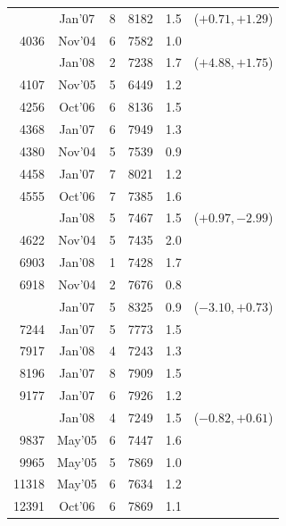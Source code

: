 \begin{table}
{\begin{tabular}{|r c c c c c|}
       &  Jan\hfill '07   &    8 &  8182  &   1.5 & ($+0.71 , +1.29$) \\
 4036  &  Nov\hfill '04   &    6 &  7582  &   1.0 &                   \\
       &  Jan\hfill '08   &    2 &  7238  &   1.7 & ($+4.88 , +1.75$) \\
 4107  &  Nov\hfill '05   &    5 &  6449  &   1.2 &                   \\
 4256  &  Oct\hfill '06   &    6 &  8136  &   1.5 &                   \\
 4368  &  Jan\hfill '07   &    6 &  7949  &   1.3 &                   \\
 4380  &  Nov\hfill '04   &    5 &  7539  &   0.9 &                   \\
 4458  &  Jan\hfill '07   &    7 &  8021  &   1.2 &                   \\
 4555  &  Oct\hfill '06   &    7 &  7385  &   1.6 &                   \\
       &  Jan\hfill '08   &    5 &  7467  &   1.5 & ($+0.97 , -2.99$) \\
 4622  &  Nov\hfill '04   &    5 &  7435  &   2.0 &                   \\
 6903  &  Jan\hfill '08   &    1 &  7428  &   1.7 &                   \\
 6918  &  Nov\hfill '04   &    2 &  7676  &   0.8 &                   \\
       &  Jan\hfill '07   &    5 &  8325  &   0.9 & ($-3.10 , +0.73$) \\
 7244  &  Jan\hfill '07   &    5 &  7773  &   1.5 &                   \\
 7917  &  Jan\hfill '08   &    4 &  7243  &   1.3 &                   \\
 8196  &  Jan\hfill '07   &    8 &  7909  &   1.5 &                   \\
 9177  &  Jan\hfill '07   &    6 &  7926  &   1.2 &                   \\
       &  Jan\hfill '08   &    4 &  7249  &   1.5 & ($-0.82 , +0.61$) \\
 9837  &  May\hfill '05   &    6 &  7447  &   1.6 &                   \\
 9965  &  May\hfill '05   &    5 &  7869  &   1.0 &                   \\
11318  &  May\hfill '05   &    6 &  7634  &   1.2 &                   \\
12391  &  Oct\hfill '06   &    6 &  7869  &   1.1 &                   \\
\hline

\end{tabular}}
\end{table}

